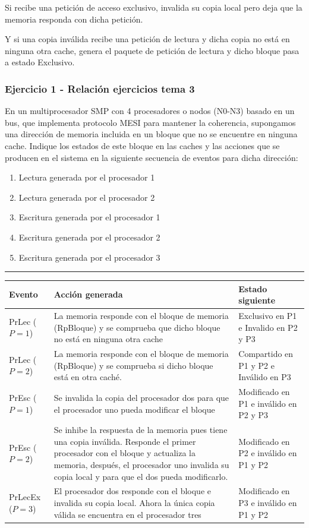 \documentclass[10pt,a4paper,spanish]{report}
\begin{document}
Si recibe una petición de acceso exclusivo, invalida su copia local pero deja que la memoria responda con dicha petición.

Y si una copia inválida recibe una petición de lectura y dicha copia no está en ninguna otra cache, genera el paquete de petición de lectura y dicho bloque pasa a estado Exclusivo.

\textcolor[rgb]{0.2,0.4,0.8}{\subsubsection{Ejercicio 1 - Relación ejercicios tema 3}}

En un multiprocesador SMP con 4 procesadores o nodos (N0-N3) basado en un bus, que implementa protocolo MESI para mantener la coherencia, supongamos una dirección de memoria incluida en un bloque que no se encuentre en ninguna cache. Indique los estados de este bloque en las caches y las acciones que se producen en el sistema en la siguiente secuencia de eventos para dicha dirección:

\begin{enumerate}
    \item Lectura generada por el procesador 1
    \item Lectura generada por el procesador 2
    \item Escritura generada por el procesador 1
    \item Escritura generada por el procesador 2
    \item Escritura generada por el procesador 3
\end{enumerate}

\rule{\linewidth}{0.05mm}

\begin{tabular}{||p{2.5cm}|p{10cm}|p{1.7cm}||}
\hline
\textbf{Evento} & \textbf{Acción generada} & \textbf{Estado siguiente} \\
\hline
PrLec ($P=1$) & La memoria responde con el bloque de memoria (RpBloque) y se comprueba que dicho bloque no está en ninguna otra cache & Exclusivo en P1 e Invalido en P2 y P3 \\ 
\hline
PrLec ($P=2$) & La memoria responde con el bloque de memoria (RpBloque) y se comprueba si dicho bloque está en otra caché. & Compartido en P1 y P2 e Inválido en P3 \\
\hline
PrEsc ($P=1$) & Se invalida la copia del procesador dos para que el procesador uno pueda modificar el bloque & Modificado en P1 e inválido en P2 y P3 \\
\hline
PrEsc ($P=2$) & Se inhibe la respuesta de la memoria pues tiene una copia inválida. Responde el primer procesador con el bloque y actualiza la memoria, después, el procesador uno invalida su copia local y para que el dos pueda modificarlo. & Modificado en P2 e inválido en P1 y P2 \\
\hline
PrLecEx ($P=3$) & El procesador dos responde con el bloque e invalida su copia local. Ahora la única copia válida se encuentra en el procesador tres & Modificado en P3 e inválido en P1 y P2 \\
\hline
\end{tabular}
\end{document}
